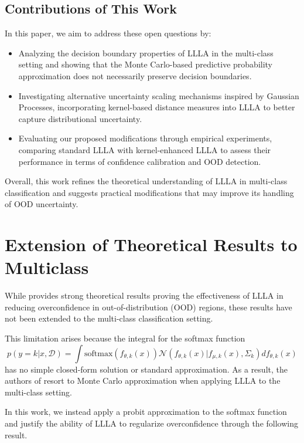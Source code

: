 \documentclass{article}
\begin{document}
\subsection{Contributions of This Work}

In this paper, we aim to address these open questions by:
\begin{itemize}
    \item Analyzing the decision boundary properties of LLLA in the multi-class setting and showing that the Monte Carlo-based predictive probability approximation does not necessarily preserve decision boundaries.
    \item Investigating alternative uncertainty scaling mechanisms inspired by Gaussian Processes, incorporating kernel-based distance measures into LLLA to better capture distributional uncertainty.
    \item Evaluating our proposed modifications through empirical experiments, comparing standard LLLA with kernel-enhanced LLLA to assess their performance in terms of confidence calibration and OOD detection.
\end{itemize}

Overall, this work refines the theoretical understanding of LLLA in multi-class classification and suggests practical modifications that may improve its handling of OOD uncertainty.


\section{Extension of Theoretical Results to Multiclass}
While \cite{main_paper} provides strong theoretical results proving the effectiveness of LLLA in reducing overconfidence in out-of-distribution (OOD) regions, these results have not been extended to the multi-class classification setting.

This limitation arises because the integral for the softmax function
\begin{equation}
\label{softmax_integration}
    p(y=k | x, \mathcal{D}) = \int \text{softmax}(f_{\theta, k}(x)) 
    \mathcal{N}(f_{\theta, k}(x) | f_{\mu, k}(x), \Sigma_k) df_{\theta, k}(x)
\end{equation}
has no simple closed-form solution or standard approximation. As a result, the authors of \cite{main_paper} resort to Monte Carlo approximation when applying LLLA to the multi-class setting.

In this work, we instead apply a probit approximation to the softmax function and justify the ability of LLLA to regularize overconfidence through the following result.
\end{document}
